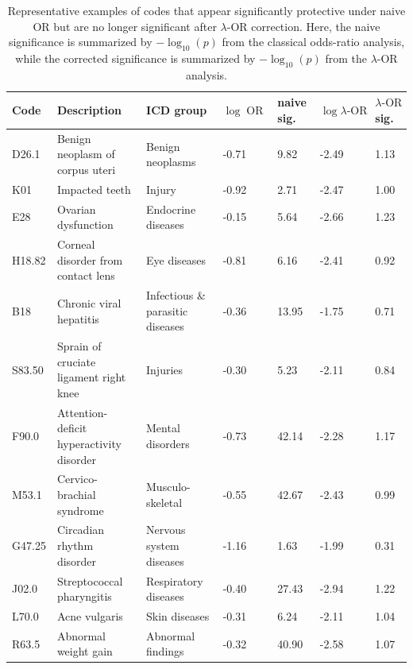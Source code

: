 \documentclass[pdflatex,sn-mathphys-num]{sn-jnl}%
\newcommand{\SPOR}{\textrm{$\lambda$-OR}}
\newcommand{\COR}{\operatorname{OR}}
\newcommand{\logor}{\log\SPOR}
\newcommand{\clogor}{\log\COR}
\theoremstyle{thmstyleone}%
\theoremstyle{thmstyletwo}%
\theoremstyle{thmstylethree}%
\begin{document}
\begin{table}[t]
\centering
\caption{Representative examples of codes that appear significantly protective under naive OR but are  no longer significant after $\SPOR$ correction. Here, the naive significance is summarized by $-\log_{10}(p)$ from the classical odds-ratio analysis, while the corrected significance is summarized by $-\log_{10}(p)$ from the $\SPOR$ analysis.}
\label{tab:protective_examples}
\begin{tabular}{>{\raggedright\arraybackslash}p{.4in}>{\raggedright\arraybackslash}p{.8in}>{\raggedright\arraybackslash}p{.8in}p{.4in}p{.4in}p{.6in}p{.4in}}
\toprule
Code & Description & ICD group & $\clogor$ & naive sig. & $\logor$ & $\SPOR$ sig. \\
\midrule
D26.1 & Benign neoplasm of corpus uteri & Benign neoplasms & -0.71 & 9.82 & -2.49 & 1.13 \\
K01 & Impacted teeth & Injury & -0.92 & 2.71 & -2.47 & 1.00 \\
E28 & Ovarian dysfunction & Endocrine diseases& -0.15 & 5.64 & -2.66 & 1.23 \\
H18.82 & Corneal disorder from contact lens & Eye diseases & -0.81 & 6.16 & -2.41 & 0.92 \\
B18 & Chronic viral hepatitis & Infectious \& parasitic diseases & -0.36 & 13.95 & -1.75 & 0.71 \\
S83.50 & Sprain of  cruciate ligament right knee & Injuries  & -0.30 & 5.23 & -2.11 & 0.84 \\
F90.0 & Attention-deficit hyperactivity disorder & Mental  disorders & -0.73 & 42.14 & -2.28 & 1.17 \\
M53.1 & Cervico- brachial syndrome & Musculo- skeletal  & -0.55 & 42.67 & -2.43 & 0.99 \\
G47.25 & Circadian rhythm  disorder & Nervous system  diseases& -1.16 & 1.63 & -1.99 & 0.31 \\
J02.0 & Streptococcal pharyngitis & Respiratory diseases & -0.40 & 27.43 & -2.94 & 1.22 \\
L70.0 & Acne vulgaris & Skin  diseases & -0.31 & 6.24 & -2.11 & 1.04 \\
R63.5 & Abnormal weight gain & Abnormal findings & -0.32 & 40.90 & -2.58 & 1.07 \\
\bottomrule
\end{tabular}
\end{table}
\end{document}

